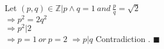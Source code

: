 \documentclass{article}
\begin{document}
\noindent Let $(p, q) \in \mathbb{Z} | p \land q = 1 \ and \ \frac{p}{q} = \sqrt{2}$\\
$\Rightarrow p^2 = 2q^2$ \\
$\Rightarrow p^2 | 2$\\
$\Rightarrow p = 1 \ or \ p = 2$
$\Rightarrow p | q $ Contradiction . $\blacksquare$
\end{document}
